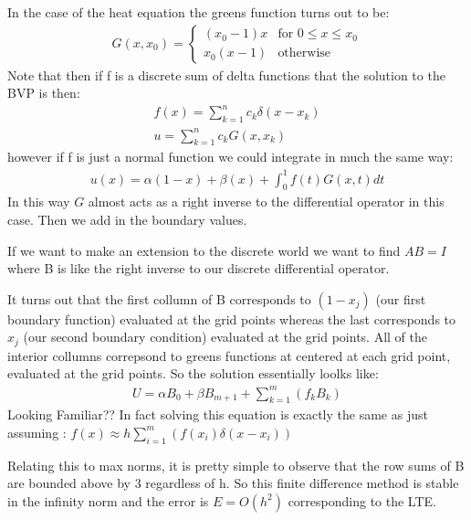 \documentclass[12pt]{article}
\begin{document}
In the case of the heat equation the greens function turns out to be:
\begin{align}
	G(x,x_0)=\begin{cases}
		         (x_0-1)x & \text{for }0\leq x\leq x_0 \\
		         x_0(x-1) & \text{otherwise}
	         \end{cases}
\end{align}
Note that then if f is a discrete sum of delta functions that the solution to the BVP is then:
\begin{align}
	f(x)=\sum_{k=1}^nc_k\delta (x-x_k) \\
	u=\sum_{k=1}^nc_kG(x,x_k)
\end{align}
however if f is just a normal function we could integrate in much the same way:
\begin{align}
	u(x)=\alpha (1-x)+ \beta(x) +\int_0^1 f(t)G(x,t)dt
\end{align}
In this way $G$ almost acts as a right inverse to the differential operator in this case. Then we add in the boundary values.

If we want to make an extension to the discrete world we want to find $AB=I$ where B is like the right inverse to our discrete differential operator.

It turns out that the first collumn of B corresponds to $(1-x_j)$ (our first boundary function) evaluated at the grid points whereas the last corresponds to $x_j$ (our second boundary condition) evaluated at the grid points. All of the interior collumns correpsond to greens functions at centered at each grid point, evaluated at the grid points. So the solution essentially loolks like:
\begin{align}
	U=\alpha B_0 +\beta B_{m+1}+\sum\limits_{k=1}^{m}\left(f_kB_k\right)
\end{align}
Looking Familiar?? In fact solving this equation is exactly the same as just assuming :
$f(x)\approx h\sum\limits_{i=1}^{m}\left(f(x_i)\delta(x-x_i)\right)$

Relating this to max norms, it is pretty simple to observe that the row sums of B are bounded above by $3$ regardless of h. So this finite difference method is stable in the infinity norm and the error is $E=O(h^2)$ corresponding to the LTE.
\end{document}
